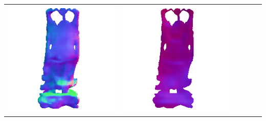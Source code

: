 \begin{center}
\begin{tabularx}{\linewidth}{@{}Y@{}Y@{}Y@{}Y@{}Y@{}Y@{}}
\includegraphics[width=\linewidth]{semisynthetic/20150514_20_marrnet_out.png} &
\includegraphics[width=\linewidth]{semisynthetic/20150514_20_ef_out.png} \\

\end{tabularx}
\end{center}
